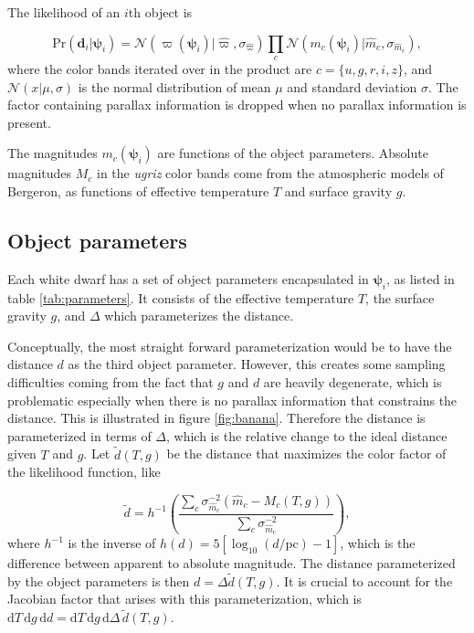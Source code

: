 \documentclass[fleqn,usenatbib]{mnras}
\newcommand{\objp}{\boldsymbol{\psi}}
\newcommand{\data}{\mathbf{d}}
\newcommand{\Teff}{T}
\newcommand{\logg}{g}
\newcommand{\pr}{\text{Pr}}
\newcommand{\de}{\text{d}}
\begin{document}
The likelihood of an $i$th object is

\begin{equation}
	\pr(\data_i | \objp_i) = \mathcal{N}(\varpi(\objp_i)|\hat{\varpi},\sigma_{\hat{\varpi}})\prod_{c} \mathcal{N}(m_c(\objp_i)|\hat{m}_c,\sigma_{\hat{m}_c}),
\end{equation}
where the color bands iterated over in the product are $c = \{u,g,r,i,z\}$, and $\mathcal{N}(x | \mu,\sigma)$ is the normal distribution of mean $\mu$ and standard deviation $\sigma$. The factor containing parallax information is dropped when no parallax information is present.

The magnitudes $m_c(\objp_i)$ are functions of the object parameters. Absolute magnitudes $M_c$ in the \emph{ugriz} color bands come from the atmospheric models of Bergeron, as functions of effective temperature $\Teff$ and surface gravity $\logg$.








\subsection{Object parameters}\label{sec:objectparams}

Each white dwarf has a set of object parameters encapsulated in $\objp_i$, as listed in table \ref{tab:parameters}. It consists of the effective temperature $\Teff$, the surface gravity $\logg$, and $\Delta$ which parameterizes the distance.

Conceptually, the most straight forward parameterization would be to have the distance $d$ as the third object parameter. However, this creates some sampling difficulties coming from the fact that $\logg$ and $d$ are heavily degenerate, which is problematic especially when there is no parallax information that constrains the distance. This is illustrated in figure \ref{fig:banana}. Therefore the distance is parameterized in terms of $\Delta$, which is the relative change to the ideal distance given $\Teff$ and $\logg$. Let $\tilde{d}(\Teff,\logg)$ be the distance that maximizes the color factor of the likelihood function, like

\begin{equation}
	\tilde{d} = 
    h^{-1}\left( \frac{\sum_c \sigma_{\hat{m}_c}^{-2} (\hat{m}_c-M_c(\Teff,\logg))}{\sum_c \sigma_{\hat{m}_c}^{-2}} \right),
\end{equation}
where $h^{-1}$ is the inverse of $h(d)=5[\log_{10}(d/\text{pc})-1]$, which is the difference between apparent to absolute magnitude. The distance parameterized by the object parameters is then $d=\Delta\tilde{d}(\Teff,\logg)$. It is crucial to account for the Jacobian factor that arises with this parameterization, which is $\de \Teff\, \de \logg\, \de d = \de \Teff\, \de \logg\, \de \Delta\, \tilde{d}(\Teff,\logg)$.
\end{document}
